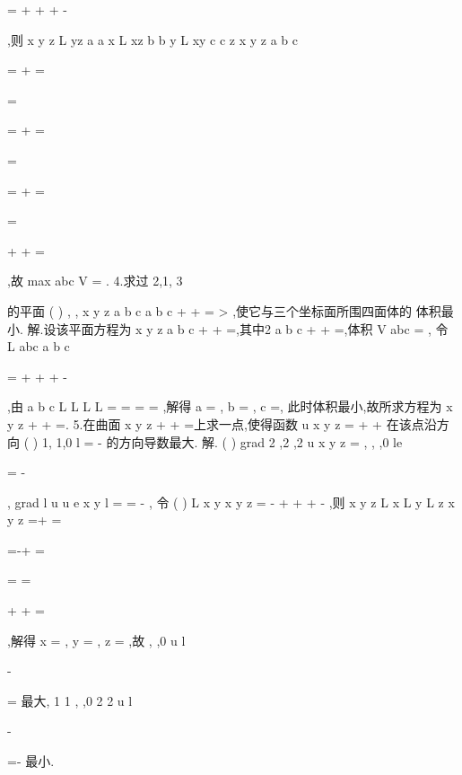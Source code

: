 =
+
+
+
-




,则
x
y
z
L
yz
a
a
x
L
xz
b
b
y
L
xy
c
c
z
x
y
z
a
b
c
\lambda 
\lambda 
\lambda 

=
+
\cdots 
=

=




=
+
\cdots 
=


\Rightarrow 
=




=
+
\cdots 
=

=



+
+
=

,故
max
abc
V
=
. 
4.求过
2,1, 3






的平面
(
)
, ,
x
y
z
a b c
a
b
c
+
+
=
>
,使它与三个坐标面所围四面体的 
体积最小. 
解.设该平面方程为
x
y
z
a
b
c
+
+
=,其中2
a
b
c
+
+
=,体积
V
abc
=
, 
令
L
abc
a
b
c
\lambda 

=
+
+
+
-




,由
a
b
c
L
L
L
L\lambda 
=
=
=
=
,解得
a =
,
b =
,
c =, 
此时体积最小,故所求方程为
x
y
z
+
+
=. 
5.在曲面
x
y
z
+
+
=上求一点,使得函数
u
x
y
z
=
+
+
在该点沿方向 
(
)
1, 1,0
l =
-
\rho 
的方向导数最大. 
解.
(
)
grad
2 ,2 ,2
u
x
y
z
=
,
,
,0
le


=
-




\rho 
,
grad
l
u
u e
x
y
l
\partial 
=
\cdots 
=
-
\partial 
\rho 
, 
令
(
)
L
x
y
x
y
z
\lambda 
=
-
+
+
+
-
,则
x
y
z
L
x
L
y
L
z
x
y
z
\lambda 
\lambda 
\lambda 
=+
=


=-+
=

=
=


+
+
=

,解得 
x =\pm 
,
y =\mu 
,
z =
,故
,
,0
u
l 

-




\partial 
=
\partial 
最大,
1 1
, ,0
2 2
u
l 

-




\partial 
=-
\partial 
最小. 